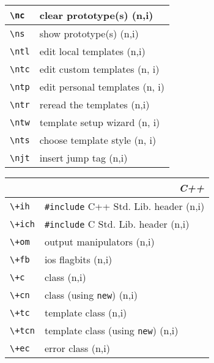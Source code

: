 \documentclass[oneside,11pt,landscape,DIV16]{scrartcl}
\begin{document}
\begin{multicols}{3}
\begin{center}
\begin{tabular}[]{|p{11mm}|p{60mm}|}
\hline     \verb'\nc'  & clear  prototype(s)       \hfill (n,i)\\
\hline     \verb'\ns'  & show   prototype(s)       \hfill (n,i)\\
%
\hline     \verb'\ntl' & edit local templates      \hfill (n,i)\\
\hline     \verb'\ntc' & edit custom templates     \hfill (n, i)\\
\hline     \verb'\ntp' & edit personal templates   \hfill (n, i)\\
\hline     \verb'\ntr' & reread the templates      \hfill (n,i)\\
\hline     \verb'\ntw' & template setup wizard     \hfill (n, i)\\
\hline     \verb'\nts' & choose template style     \hfill (n, i)\\
\hline     \verb'\njt' & insert jump tag           \hfill (n,i)\\
\hline
\end{tabular}
%
%
\begin{tabular}[]{|p{12mm}|p{60mm}|}
\hline 
\multicolumn{2}{|r|}{\textsl{C\textbf{++}}} \\
\hline \verb'\+ih'  & \verb$#include$ C++ Std. Lib. header \hfill (n,i)\\
\hline \verb'\+ich' & \verb$#include$ C   Std. Lib. header \hfill (n,i)\\
\hline \verb'\+om'  & output manipulators                  \hfill (n,i)\\
\hline \verb'\+fb'  & ios flagbits                         \hfill (n,i)\\
\hline
\hline \verb'\+c'   & class                                \hfill (n,i)\\
\hline \verb'\+cn'  & class (using \verb'new')             \hfill (n,i)\\
\hline \verb'\+tc'  & template class                       \hfill (n,i)\\
\hline \verb'\+tcn' & template class (using \verb'new')    \hfill (n,i)\\
\hline \verb'\+ec'  & error class                          \hfill (n,i)\\

\end{tabular}
\end{center}
\end{multicols}
\end{document}
